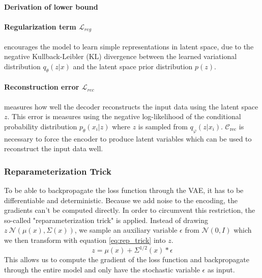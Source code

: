\paragraph{Derivation of lower bound}


\paragraph{Regularization term $\mathcal{L}_{reg}$} encourages the model to learn simple representations in latent space, due to the negative Kullback-Leibler (KL) divergence between the learned variational distribution $q_\theta(z|x)$ and the latent space prior distribution $p(z)$.



\paragraph{Reconstruction error $\mathcal{L}_{rec}$} measures how well the decoder reconstructs the input data using the latent space $z$.
This error is measures using the negative log-likelihood of the conditional probability distribution $p_\theta(x_i|z)$ where $z$ is sampled from $q_\varphi(z | x_i)$.
$\mathcal{C}_{\mathrm{rec}}$ is necessary to force the encoder to produce latent variables which can be used to reconstruct the input data well.








\subsubsection{Reparameterization Trick}
To be able to backpropagate the loss function through the VAE, it has to be differentiable and deterministic.
Because we add noise to the encoding, the gradients can't be computed directly. In order to circumvent this restriction, the so-called "reparameterization trick" is applied.
Instead of drawing $z ~ \mathcal{N}(\mu(x), \Sigma(x))$, we sample an auxiliary variable $\epsilon$ from $\mathcal{N}(0, I)$ which we then transform with equation \ref{eq:rep_trick} into $z$.
\begin{equation}
  \label{eq:rep_trick}
  z = \mu(x) + \Sigma^{1/2}(x)*\epsilon
\end{equation}
This allows us to compute the gradient of the loss function and backpropagate through the entire model and only have the stochastic variable $\epsilon$ as input.\\\\

